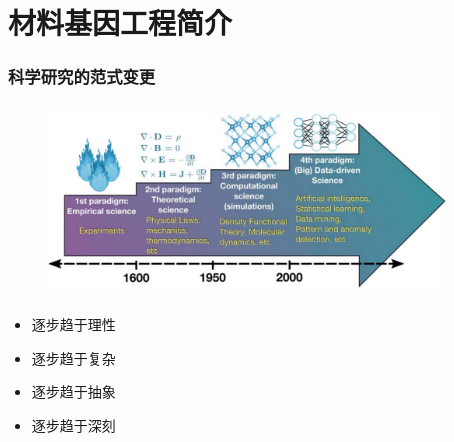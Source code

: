 \small
\section{材料基因工程简介}
\frame
{
	\frametitle{科学研究的范式变更}
\begin{figure}[h!]
\vspace*{-0.28in}
\centering
\includegraphics[height=2.00in,width=4.15in]{Figures/Four_Model_3.png}
\label{Four_Model}
\end{figure}
\begin{minipage}[b]{0.48\textwidth}
 {\fontsize{7.5pt}{6.0pt}\selectfont\begin{itemize}%
	 \setlength{\itemsep}{10pt}
 \item 逐步趋于理性
 \item 逐步趋于复杂
 \end{itemize}}
\end{minipage}
\hfill
\begin{minipage}[b]{0.48\textwidth}
 {\fontsize{7.5pt}{6.0pt}\selectfont\begin{itemize}%
	 \setlength{\itemsep}{10pt}
 \item 逐步趋于抽象
 \item 逐步趋于深刻
 \end{itemize}}
\end{minipage}
}

